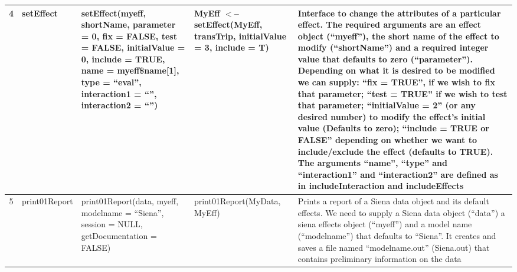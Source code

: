 \documentclass[a4paper,fleqn]{article}
\newcommand{\+}{\, + \,}
\begin{document}
{\begin{landscape}
\begin{footnotesize}
\begin{longtable}{c | p{3cm} | p{5.2cm} | p{4.2cm} | p{8.5cm} }
4 & setEffect &setEffect(myeff, shortName, parameter = 0, fix = FALSE, test =
FALSE, initialValue = 0, include = TRUE, name = myeff\$name[1], type = ``eval'',
interaction1 = ``'', interaction2 = ``'') & MyEff $<$-- setEffect(MyEff,
transTrip, initialValue = 3, include = T) & Interface to change the attributes
of a particular effect. The required arguments are an effect object (``myeff''),
the short name of the effect to modify (``shortName'') and a required integer
value that defaults to zero (``parameter''). Depending on what it is desired to
be modified we can supply: ``fix = TRUE'', if we wish to fix that parameter;
``test = TRUE'' if we wish to test that parameter; ``initialValue = 2'' (or any
desired number) to modify the effect's initial value (Defaults to zero);
``include = TRUE or FALSE'' depending on whether we want to include/exclude the
effect (defaults to TRUE). The arguments ``name'', ``type'' and ``interaction1''
and
``interaction2'' are defined as in includeInteraction  and includeEffects\\
\hline

5 & print01Report & print01Report(data, myeff, modelname = ``Siena'', session =
NULL, getDocumentation = FALSE) & print01Report(MyData, MyEff) & Prints a report
of a Siena data object and its default effects. We need to supply a Siena data
object (``data'') a siena effects object (``myeff'') and a model name
(``modelname'') that defaults to ``Siena''. It creates and saves a file named
``modelname.out'' (Siena.out) that contains preliminary information
on the data\\
\hline


\end{longtable}
\end{footnotesize}
\end{landscape}}
\end{document}
